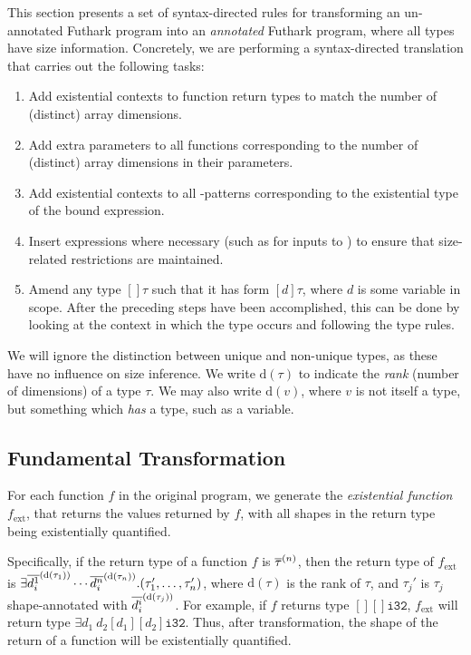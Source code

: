 This section presents a set of syntax-directed rules for transforming
an un-annotated Futhark program into an \textit{annotated} Futhark
program, where all types have size information.  Concretely, we are
performing a syntax-directed translation that carries out the
following tasks:

\begin{enumerate}
\item Add existential contexts to function return types to match the
  number of (distinct) array dimensions.
\item Add extra parameters to all functions corresponding to the
  number of (distinct) array dimensions in their parameters.
\item Add existential contexts to all -patterns corresponding
  to the existential type of the bound expression.
\item Insert  expressions where necessary (such as for
  inputs to ) to ensure that size-related restrictions are
  maintained.
\item Amend any type $[]\tau$ such that it has form $[d]\tau$, where
  $d$ is some variable in scope.  After the preceding steps have been
  accomplished, this can be done by looking at the context in which
  the type occurs and following the type rules.
\end{enumerate}

We will ignore the distinction between unique and non-unique types, as
these have no influence on size inference.  We write $\text{d}(\tau)$
to indicate the \emph{rank} (number of dimensions) of a type $\tau$.
We may also write $\text{d}(v)$, where $v$ is not itself a type, but
something which {\em has} a type, such as a variable.

\subsection{Fundamental Transformation}
\label{sec:FundamentalTransformation}

\newcommand{\ext}{\textrm{ext}}
\newcommand{\shape}{\textrm{shape}}
\newcommand{\val}{\textrm{value}}
\newcommand{\checking}{\textrm{checking}}

For each function $f$ in the original program, we generate the
\textit{existential function} $f_{\ext}$, that returns the values
returned by $f$, with all shapes in the return type being
existentially quantified.

Specifically, if the return type of a function \(f\) is
$\overline{\tau}^{(n)}$, then the return type of \(f_{\ext}\) is
\(\exists\overline{d^{1}_{i}}^{(\text{d}(\tau_{1}))}\cdots\overline{d^{n}_{i}}^{(\text{d}(\tau_{n}))}.(\tau_{1}',
\ldots, \tau_{n}')\), where $\text{d}(\tau)$ is the rank of $\tau$,
and \(\tau_{j}'\) is \(\tau_{j}\) shape-annotated with
\(\overline{d^{i}_{i}}^{(\text{d}(\tau_{j}))}\).
%
For example, if \(f\) returns type \([][]\texttt{i32}\), \(f_{\ext}\)
will return type \(\exists d_{1}~d_{2}[d_{1}][d_{2}]\texttt{i32}\).
Thus, after transformation, the shape of the return of a function will
be existentially quantified.

